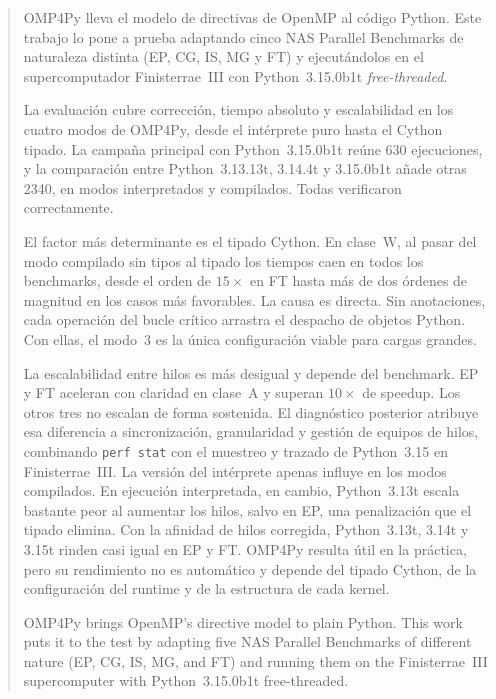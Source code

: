 
\begin{abstract}
\thispagestyle{empty}
OMP4Py lleva el modelo de directivas de OpenMP al código Python. Este trabajo lo
pone a prueba adaptando cinco NAS Parallel Benchmarks de naturaleza distinta
(EP, CG, IS, MG y FT) y ejecutándolos en el supercomputador Finisterrae~III con
Python~3.15.0b1t \emph{free-threaded}.

La evaluación cubre corrección, tiempo absoluto y escalabilidad en los cuatro
modos de OMP4Py, desde el intérprete puro hasta el Cython tipado. La campaña
principal con Python~3.15.0b1t reúne 630 ejecuciones, y la comparación entre
Python~3.13.13t, 3.14.4t y 3.15.0b1t añade otras 2340, en modos interpretados y
compilados. Todas verificaron correctamente.

El factor más determinante es el tipado Cython. En clase~W, al pasar del modo
compilado sin tipos al tipado los tiempos caen en todos los benchmarks, desde el
orden de $15\times$ en FT hasta más de dos órdenes de magnitud en los casos más
favorables. La causa es directa. Sin anotaciones, cada operación del bucle
crítico arrastra el despacho de objetos Python. Con ellas, el modo~3 es la única
configuración viable para cargas grandes.

La escalabilidad entre hilos es más desigual y depende del benchmark.
EP y FT aceleran con claridad en clase~A y superan $10\times$ de speedup. Los
otros tres no escalan de forma sostenida. El diagnóstico posterior atribuye esa
diferencia a sincronización, granularidad y gestión de equipos de hilos,
combinando \texttt{perf stat} con el muestreo y trazado de Python~3.15 en
Finisterrae~III. La versión del intérprete apenas influye en los modos
compilados. En ejecución interpretada, en cambio, Python~3.13t escala bastante
peor al aumentar los hilos, salvo en EP, una penalización que el tipado elimina.
Con la afinidad de hilos corregida, Python~3.13t, 3.14t y 3.15t rinden casi igual
en EP y FT.
OMP4Py resulta útil en la práctica, pero su rendimiento no es automático y
depende del tipado Cython, de la configuración del runtime y de la estructura de
cada kernel.

\vspace*{25pt}
\begin{otherlanguage}{english}
\centerline{\bfseries \abstractname}
OMP4Py brings OpenMP's directive model to plain Python. This work puts it to the
test by adapting five NAS Parallel Benchmarks of different nature (EP, CG, IS,
MG, and FT) and running them on the Finisterrae~III supercomputer with
Python~3.15.0b1t free-threaded.


\end{otherlanguage}
\end{abstract}
